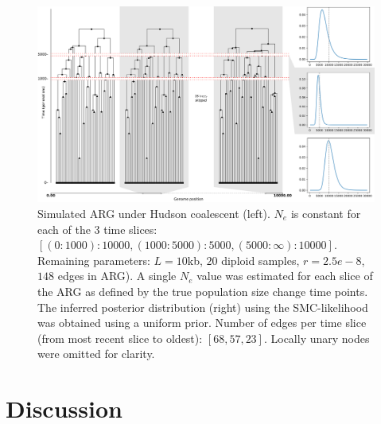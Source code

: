 \documentclass{article}
\begin{document}

\begin{figure}[!ht]
\centering
\includegraphics[width=\textwidth]{figures/3-slices-whitespace.png}
\caption{Simulated ARG under Hudson coalescent (left). $N_e$ is constant
for each of the 3 time slices: $[(0:1000): 10 000, (1000:5000): 5000,
(5000:\infty):10 000]$. Remaining parameters: $L=10$kb, $20$ diploid samples,
$r=2.5e-8$, $148$ edges in ARG). A single $N_e$ value was estimated for each
slice of the ARG as defined by the true population size change time points.
The inferred posterior distribution (right) using the SMC-likelihood was
obtained using a uniform prior. Number of edges per time slice
(from most recent slice to oldest): $[68, 57, 23]$. Locally unary nodes were
omitted for clarity.}
\label{fig:3-arg-slices}
\end{figure}

\section{Discussion}
\end{document}
